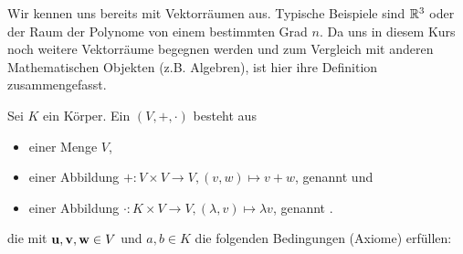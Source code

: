 Wir kennen uns bereits mit Vektorräumen aus. Typische Beispiele sind $\mathbb{R}^3$ oder der Raum der Polynome von einem bestimmten Grad $n$. Da uns in diesem Kurs noch weitere Vektorräume begegnen werden und zum Vergleich mit anderen Mathematischen Objekten (z.B. Algebren), ist hier ihre Definition zusammengefasst.


\begin{definition}[Vektorräume]\label{vektorraeume:def}
	Sei $K$ ein Körper. Ein  $(V,+,\cdot)$ besteht aus
	\begin{itemize}
		\item einer Menge $V$,
		\item einer Abbildung $+: V \times V \to V, (v,w) \mapsto v+w$, genannt  und
		\item einer Abbildung $\cdot: K \times V \to V, (\lambda,v) \mapsto \lambda v$, genannt .
	\end{itemize}
	die mit $\mathbf{u},\mathbf{v},\mathbf{w}\in V$ und $a,b \in K$ die folgenden Bedingungen (Axiome) erfüllen:

		
		\begin{table}[!ht]
			\setlength\extrarowheight{10pt} %
			\begin{tabularx}{\textwidth}{C X}
				

\end{tabularx}
\end{table}
\end{definition}
